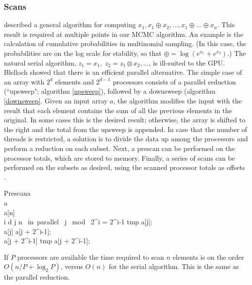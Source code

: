 
\subsubsection{Scans}
\citet{blelloch1990} described a general algorithm for computing $x_1,
x_1 \oplus x_2, \ldots, x_1 \oplus \ldots \oplus x_n$. This result is required at multiple points in our MCMC algorithm. An example is the calculation of cumulative probabilities in multinomial sampling. (In this case, the probabilities are on the log scale for stability, so that $\oplus=\log(e^{x_1}+e^{x_2})$.) The natural serial algorithm, $z_1 = x_1,\;z_2 = z_1 \otimes x_2,\dots$, is ill-suited to the GPU. Blelloch showed that there is an efficient parallel alternative. The simple case of an array with $2^d$ elements and $2^{d-1}$ processors consists of a parallel reduction (``upsweep"; algorithm \ref{upsweep}), followed by a downsweep (algorithm \ref{downsweep}. Given an input array $a$, the algorithm modifies the input with the result that each element contains the sum of all the previous elements in the original. In some cases this is the desired result; otherwise, the array is shifted to the right and the total from the upsweep is appended. In case that the number of threads is restricted, a solution is to divide the data up among the processors and perform a reduction on each subset. Next, a prescan can be performed on the processor totals, which are stored to memory. Finally, a series of scans can be performed on the subsets as desired, using the scanned processor totals as offsets \cite{blelloch1990}.
\begin{pseudocode}[ruled]{Prescan}{a}
\label{downsweep}
\\
a \GETS {}\\
a[n] \\
\FOR i \GETS d  \DO \BEGIN
  \FOR j  \TO n \mbox{ in parallel }\DO \BEGIN
    \IF j \mbox{ mod } 2^i = 2^{i-1} \DO \BEGIN
    tmp \GETS a[j];\\
    a[j] \GETS a[j + 2^{i-1}];\\
    a[j + 2^{i-1}] \GETS tmp \oplus a[j + 2^{i-1}];
    \END \END \END
{}
\end{pseudocode}


If $P$ processors are available
the time required to scan $n$ elements is on the order $O(n/P + \log_2P)$, versus $O(n)$ for the serial algorithm. This is the same as the parallel reduction.

